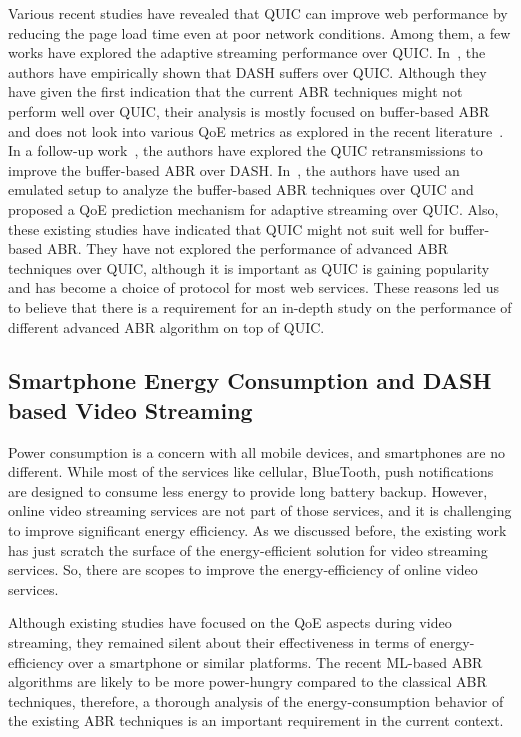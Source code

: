Various recent studies \cite{Biswal2016,Megyesi2016,bhat2017not} have revealed that QUIC can improve web performance by reducing the page load time even at poor network conditions. Among them, a few works have explored the adaptive streaming performance over QUIC. In~\cite{bhat2017not}, the authors have empirically shown that DASH suffers over QUIC. Although they have given the first indication that the current ABR techniques might not perform well over QUIC, their analysis is mostly focused on buffer-based ABR and does not look into various QoE metrics as explored in the recent literature~\cite{yin2015control,mao2017neural}. In a follow-up work~\cite{bhat2018improving}, the authors have explored the QUIC retransmissions to improve the buffer-based ABR over DASH. In~\cite{van2018empirical}, the authors have used an emulated setup to analyze the buffer-based ABR techniques over QUIC and proposed a QoE prediction mechanism for adaptive streaming over QUIC. Also, these existing studies have indicated that QUIC might not suit well for buffer-based ABR. They have not explored the performance of advanced ABR techniques over QUIC, although it is important as QUIC is gaining popularity and has become a choice of protocol for most web services. These reasons led us to believe that there is a requirement for an in-depth study on the performance of different advanced ABR algorithm on top of QUIC.

\subsection{Smartphone Energy Consumption and DASH based Video Streaming}
Power consumption is a concern with all mobile devices, and smartphones are no different. While most of the services like cellular, BlueTooth, push notifications are designed to consume less energy to provide long battery backup. However, online video streaming services are not part of those services, and it is challenging to improve significant energy efficiency. As we discussed before, the existing work has just scratch the surface of the energy-efficient solution for video streaming services. So, there are scopes to improve the energy-efficiency of online video services.

Although existing studies have focused on the QoE aspects during video streaming, they remained silent about their effectiveness in terms of energy-efficiency over a smartphone or similar platforms. The recent ML-based ABR algorithms are likely to be more power-hungry compared to the classical ABR techniques, therefore, a thorough analysis of the energy-consumption behavior of the existing ABR techniques is an important requirement in the current context.

